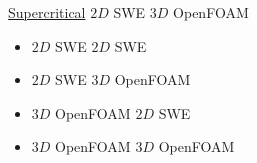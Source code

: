 \begin{frame}
\begin{minipage}{0.5\textwidth}
\centering
\Large \underline{Supercritical} $2D$ SWE    $3D$ OpenFOAM 
\end{minipage}
\hspace{4cm}
\begin{minipage}{0.21\textwidth}
\vspace{-1.5cm}
{\scriptsize
\begin{tcolorbox}[colframe=black, colback=white] 
\setlength{\leftmargini}{0pt}
\begin{itemize}
\item[] {\color{black!20}$2D$ SWE    $2D$ SWE}
\item[] {$2D$ SWE    $3D$ OpenFOAM} 
\item[]{\color{black!60}$3D$ OpenFOAM     $2D$ SWE}
\item[] {\color{black!20}$3D$ OpenFOAM     $3D$ OpenFOAM}
\end{itemize}
\end{tcolorbox}}
\end{minipage}


\end{frame}
